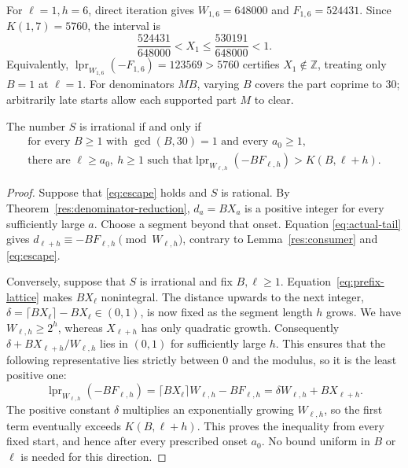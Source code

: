 \documentclass[11pt]{article}
\begin{document}
For $\ell=1,h=6$, direct iteration gives
$W_{1,6}=648000$ and $F_{1,6}=524431$. Since $K(1,7)=5760$, the interval is
\[
 \frac{524431}{648000}<X_1\le\frac{530191}{648000}<1.
\]
Equivalently, $\operatorname{lpr}_{W_{1,6}}(-F_{1,6})=123569>5760$
certifies $X_1\notin\mathbb Z$, treating only $B=1$ at $\ell=1$.
For denominators $MB$, varying $B$ covers the part coprime to $30$;
arbitrarily late starts allow each supported part $M$ to clear.

\begin{theorem}\label{res:windowconsumer}
The number $S$ is irrational if and only if
\begin{equation}\label{eq:escape}
 \begin{gathered}
 \text{for every }B\ge1\text{ with }\gcd(B,30)=1
 \text{ and every }a_0\ge1,\\
 \text{there are }\ell\ge a_0,\ h\ge1\text{ such that}
 \operatorname{lpr}_{W_{\ell,h}}(-BF_{\ell,h})>K(B,\ell+h).
 \end{gathered}
\end{equation}
\end{theorem}
\begin{proof}
Suppose that \eqref{eq:escape} holds and $S$ is rational. By
Theorem~\ref{res:denominator-reduction}, $d_a=BX_a$ is a positive integer
for every sufficiently large $a$. Choose a segment beyond that onset.
Equation \eqref{eq:actual-tail} gives
$d_{\ell+h}\equiv-BF_{\ell,h}\pmod{W_{\ell,h}}$, contrary to
Lemma~\ref{res:consumer} and \eqref{eq:escape}.

Conversely, suppose that $S$ is irrational and fix $B,\ell\ge1$.
Equation~\eqref{eq:prefix-lattice} makes $BX_\ell$ nonintegral.
The distance upwards to the next integer,
$\delta=\lceil BX_\ell\rceil-BX_\ell\in(0,1)$, is now fixed as the
segment length $h$ grows. We have $W_{\ell,h}\ge2^h$, whereas
$X_{\ell+h}$ has only quadratic growth. Consequently
$\delta+BX_{\ell+h}/W_{\ell,h}$ lies in $(0,1)$ for sufficiently large
$h$. This ensures that the following representative lies strictly
between $0$ and the modulus, so it is the least positive one:
\[
 \operatorname{lpr}_{W_{\ell,h}}(-BF_{\ell,h})
 =\lceil BX_\ell\rceil W_{\ell,h}-BF_{\ell,h}
 =\delta W_{\ell,h}+BX_{\ell+h}.
\]
The positive constant $\delta$ multiplies an exponentially growing
$W_{\ell,h}$, so the first term eventually exceeds $K(B,\ell+h)$.
This proves the inequality from every fixed start, and hence after
every prescribed onset $a_0$. No bound uniform in $B$ or $\ell$ is
needed for this direction.
\end{proof}
\end{document}
